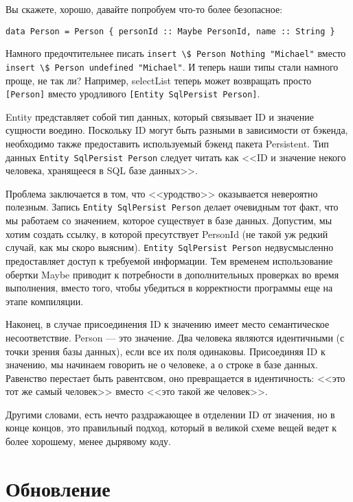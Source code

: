 Вы скажете, хорошо, давайте попробуем что-то более безопасное:

\begin{lstlisting}
data Person = Person { personId :: Maybe PersonId, name :: String }
\end{lstlisting}

Намного предочтительнее писать \lstinline'insert \$ Person Nothing "Michael"' вместо \lstinline'insert \$ Person undefined "Michael"'. И теперь наши типы стали намного проще, не так ли? Например, selectList теперь может возвращать просто \lstinline'[Person]' вместо уродливого \lstinline'[Entity SqlPersist Person]'.

\begin{remark}
Entity представляет собой тип данных, который связывает ID и значение сущности воедино. Поскольку ID могут быть разными в зависимости от бэкенда, необходимо также предоставить используемый бэкенд пакета Persistent. Тип данных \lstinline'Entity SqlPersist Person' следует читать как <<ID и значение некого человека, хранящееся в SQL базе данных>>.
\end{remark}

Проблема заключается в том, что <<уродство>> оказывается невероятно полезным. Запись \lstinline'Entity SqlPersist Person' делает очевидным тот факт, что мы работаем со значением, которое существует в базе данных. Допустим, мы хотим создать ссылку, в которой пресутствует PersonId (не такой уж редкий случай, как мы скоро выясним). \lstinline'Entity SqlPersist Person' недвусмысленно предоставляет доступ к требуемой информации. Тем временем использование обертки Maybe приводит к потребности в дополнительных проверках во время выполнения, вместо того, чтобы убедиться в корректности программы еще на этапе компиляции.

Наконец, в случае присоединения ID к значению имеет место семантическое несоответствие. Person --- это значение. Два человека являются идентичными (с точки зрения базы данных), если все их поля одинаковы. Присоединяя ID к значению, мы начинаем говорить не о человеке, а о строке в базе данных. Равенство перестает быть равентсвом, оно превращается в идентичность: <<это тот же самый человек>> вместо <<это такой же человек>>.

Другими словами, есть нечто раздражающее в отделении ID от значения, но в конце концов, это правильный подход, который в великой схеме вещей ведет к более хорошему, менее дырявому коду.

\section{Обновление} %

